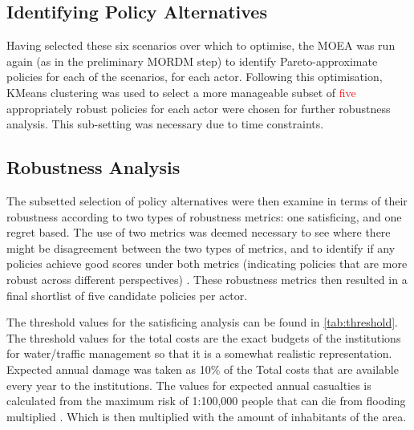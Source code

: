 \subsection{Identifying Policy Alternatives}
Having selected these six scenarios over which to optimise, the MOEA was run again (as in the preliminary MORDM step) to identify Pareto-approximate policies for each of the scenarios, for each actor. Following this optimisation, KMeans clustering was used to select a more manageable subset of \textcolor{red}{five} appropriately robust policies for each actor were chosen for further robustness analysis.  This sub-setting was necessary due to time constraints.



\subsection{Robustness Analysis}
The subsetted selection of policy alternatives were then examine in terms of their robustness according to two types of robustness metrics: one satisficing, and one regret based. The use of two metrics was deemed necessary to see where there might be disagreement between the two types of metrics, and to identify if any policies achieve good scores under both metrics (indicating  policies that are more robust across different perspectives) \parencite{mcphail_robustness_2018}. These robustness metrics then resulted in a final shortlist of five candidate policies per actor.

The threshold values for the satisficing analysis can be found in \autoref{tab:threshold}. The threshold values for the total costs are the exact budgets of the institutions for water/traffic management so that it is a somewhat realistic representation. Expected annual damage was taken as 10\% of the Total costs that are available every year to the institutions. The values for expected annual casualties is calculated from the maximum risk of 1:100,000 people that can die from flooding multiplied \parencite{slootjes_achtergronden_2016} . Which is then multiplied with the amount of inhabitants of the area.


